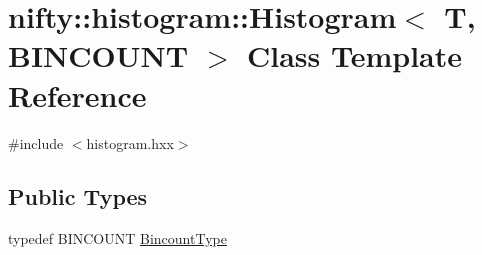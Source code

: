 \hypertarget{classnifty_1_1histogram_1_1Histogram}{}\section{nifty\+:\+:histogram\+:\+:Histogram$<$ T, B\+I\+N\+C\+O\+U\+N\+T $>$ Class Template Reference}
\label{classnifty_1_1histogram_1_1Histogram}


{\ttfamily \#include $<$histogram.\+hxx$>$}

\subsection*{Public Types}
\begin{DoxyCompactItemize}
\item 
typedef B\+I\+N\+C\+O\+U\+N\+T \hyperlink{classnifty_1_1histogram_1_1Histogram_a19ad5e06bce1f70819a7ac9cdb708cf3}{Bincount\+Type}
\end{DoxyCompactItemize}
